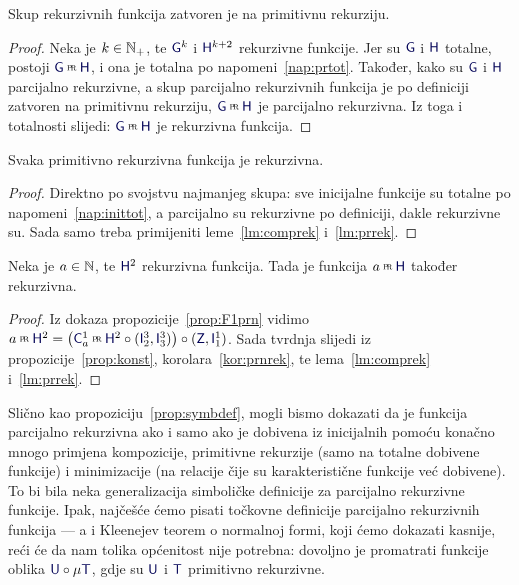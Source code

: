 \begin{lema}[{name=[zatvorenost skupa rekurzivnih funkcija na primitivnu rekurziju]}]\label{lm:prrek}
Skup rekurzivnih funkcija zatvoren je na primitivnu rekurziju.
\end{lema}
\begin{proof}
Neka je $k\in{\mathbb N}_+$, te $\f G^k$ i $\f H^{k+2}$ rekurzivne funkcije. Jer su $\f G$ i $\f H$ totalne, postoji $\f G\pr\f H$, i ona je totalna po napomeni~\ref{nap:prtot}. Također, kako su $\f G$ i $\f H$ parcijalno rekurzivne, a skup parcijalno rekurzivnih funkcija je po definiciji zatvoren na primitivnu rekurziju, $\f G\pr\f H$ je parcijalno rekurzivna. Iz toga i totalnosti slijedi: $\f G\pr\f H$ je rekurzivna funkcija.
\end{proof}

\begin{korolar}[{name=[rekurzivnost primitivno rekurzivnih funkcija]}]\label{kor:prnrek}
Svaka primitivno rekurzivna funkcija je rekurzivna.
\end{korolar}
\begin{proof}
Direktno po svojstvu najmanjeg skupa: sve inicijalne funkcije su totalne po napomeni~\ref{nap:inittot}, a parcijalno su rekurzivne po definiciji, dakle rekurzivne su. Sada samo treba primijeniti leme~\ref{lm:comprek} i~\ref{lm:prrek}.
\end{proof}

\begin{korolar}[{name=[degenerirana primitivna rekurzija iz rekurzivnih funkcija]}]\label{kor:F1rek}
Neka je $a\in{\mathbb N}$, te $\f H^2$ rekurzivna funkcija. Tada je funkcija $a\pr\f H$ također rekurzivna.
\end{korolar}
\begin{proof}
Iz dokaza propozicije~\ref{prop:F1prn}
vidimo $a\pr\f H^2=\bigl(\f C_a^1\pr\f H^2\circ(\f I_2^3,\f I_3^3)\bigr)\circ(\f Z,\f I_1^1)$. Sada tvrdnja slijedi iz propozicije~\ref{prop:konst}, korolara~\ref{kor:prnrek}, te lema~\ref{lm:comprek} i~\ref{lm:prrek}.
\end{proof}

Slično kao propoziciju~\ref{prop:symbdef}, mogli bismo dokazati da je funkcija parcijalno rekurzivna ako i samo ako je dobivena iz inicijalnih pomoću konačno mnogo primjena kompozicije, primitivne rekurzije (samo na totalne dobivene funkcije) i minimizacije (na relacije čije su karakteristične funkcije već dobivene). To bi bila neka generalizacija simboličke definicije za parcijalno rekurzivne funkcije. Ipak, najčešće ćemo pisati točkovne definicije parcijalno rekurzivnih funkcija --- a i Kleenejev teorem o normalnoj formi, koji ćemo dokazati kasnije, reći će da nam tolika općenitost nije potrebna: dovoljno je promatrati funkcije oblika $\f U\circ\mu\f T$, gdje su $\f U$ i $\f T$ primitivno rekurzivne.

